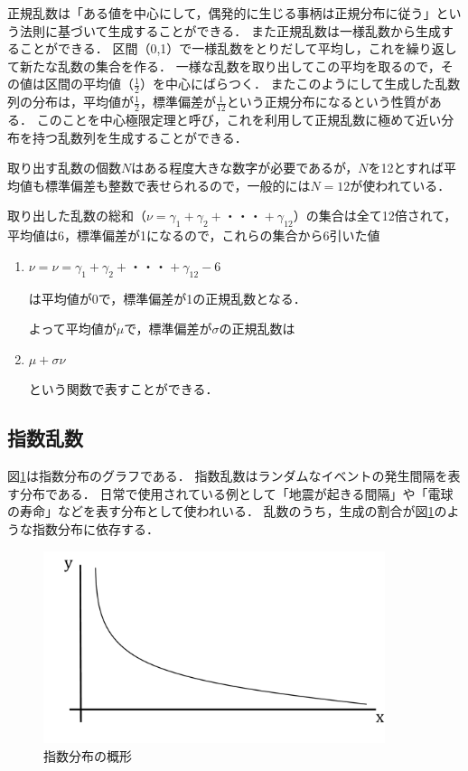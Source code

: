 \documentclass[12pt,a4j]{ltjsarticle}
\begin{document}
正規乱数は「ある値を中心にして，偶発的に生じる事柄は正規分布に従う」という法則に基づいて生成することができる．
また正規乱数は一様乱数から生成することができる．
区間（0,1）で一様乱数をとりだして平均し，これを繰り返して新たな乱数の集合を作る．
一様な乱数を取り出してこの平均を取るので，その値は区間の平均値（$\frac{1}{2}$）を中心にばらつく．
またこのようにして生成した乱数列の分布は，平均値が$\frac{1}{2}$，標準偏差が$\frac{1}{12}$という正規分布になるという性質がある．
このことを中心極限定理と呼び，これを利用して正規乱数に極めて近い分布を持つ乱数列を生成することができる．

取り出す乱数の個数$N$はある程度大きな数字が必要であるが，$N$を12とすれば平均値も標準偏差も整数で表せられるので，一般的には$N = 12$が使われている．

取り出した乱数の総和（$\nu=\gamma_1+\gamma_2+・・・+\gamma_{12}$）の集合は全て12倍されて，平均値は6，標準偏差が1になるので，これらの集合から6引いた値

\begin{enumerate}[label=(\alph*)]
	\item $\nu =  \nu=\gamma_1+\gamma_2+・・・+\gamma_{12}-6$
	
は平均値が0で，標準偏差が1の正規乱数となる．
	
よって平均値が$\mu$で，標準偏差が$\sigma$の正規乱数は
	\item $\mu+\sigma\nu$
	
という関数で表すことができる．
\end{enumerate} 

\clearpage

\subsection{指数乱数}
図\ref{fig:指数乱数のグラフ}は指数分布のグラフである．
指数乱数はランダムなイベントの発生間隔を表す分布である．
日常で使用されている例として「地震が起きる間隔」や「電球の寿命」などを表す分布として使われいる\cite{Exponential}．
乱数のうち，生成の割合が図\ref{fig:指数乱数のグラフ}のような指数分布に依存する．
\vspace{5mm}
\begin{figure}[h]
\begin{center}
\includegraphics[width = 100mm ] {figures/sisu.pdf}
\caption{指数分布の概形}
\label{fig:指数乱数のグラフ}
\end{center}
\end{figure}
\end{document}
